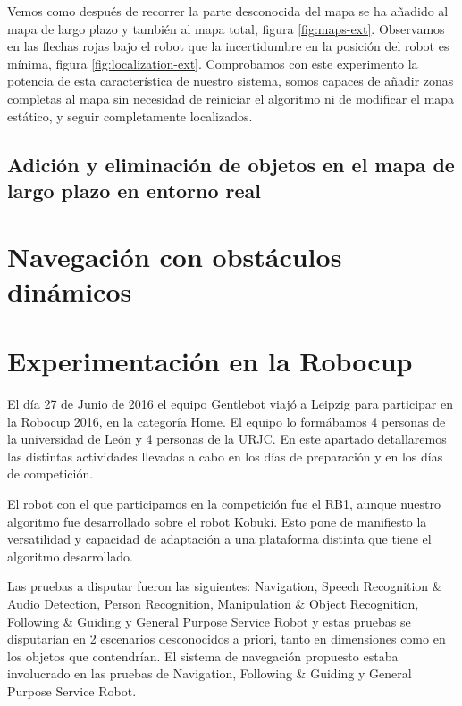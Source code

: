   Vemos como después de recorrer la parte desconocida del mapa se ha añadido al mapa de largo plazo y también al mapa total, figura \ref{fig:maps-ext}. Observamos en las flechas rojas bajo el robot que la incertidumbre en la posición del robot es mínima, figura \ref{fig:localization-ext}. Comprobamos con este experimento la potencia de esta característica de nuestro sistema, somos capaces de añadir zonas completas al mapa sin necesidad de reiniciar el algoritmo ni de modificar el mapa estático, y seguir completamente localizados.

\subsection {Adición y eliminación de objetos en el mapa de largo plazo en entorno real}
\label{sec:add-deleteobjectslongreal}

\section {Navegación con obstáculos dinámicos}
\label{cap:navegacionconobstaculos}

\section {Experimentación en la Robocup}
\label{cap:experimentacionrobocup}

El día 27 de Junio de 2016 el equipo Gentlebot viajó a Leipzig para participar en la Robocup 2016, en la categoría Home. El equipo lo formábamos 4 personas de la universidad de León y 4 personas de la URJC. En este apartado detallaremos las distintas actividades llevadas a cabo en los días de preparación y en los días de competición. 

El robot con el que participamos en la competición fue el RB1, aunque nuestro algoritmo fue desarrollado sobre el robot Kobuki. Esto pone de manifiesto la versatilidad y capacidad de adaptación a una plataforma distinta que tiene el algoritmo desarrollado. 

Las pruebas a disputar fueron las siguientes: Navigation, Speech Recognition \& Audio Detection, Person Recognition, Manipulation \& Object Recognition, Following \& Guiding y General Purpose Service Robot y estas pruebas se disputarían en 2 escenarios desconocidos a priori, tanto en dimensiones como en los objetos que contendrían. El sistema de navegación propuesto estaba involucrado en las pruebas de Navigation, Following \& Guiding y General Purpose Service Robot. 

